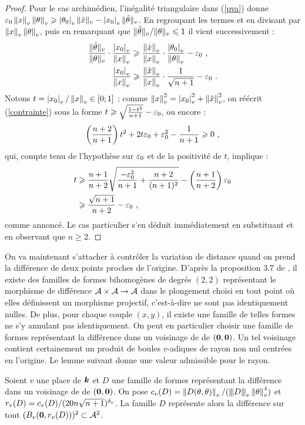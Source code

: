 \begin{proof}
  Pour le cas archimédien, l'inégalité triangulaire dans (\ref{pva}) donne
  $\varepsilon_0 \left\lVert x\right\rVert_{v}\left\lVert\theta\right\rVert_{v}  \geqslant \left\lvert\theta_0\right\rvert_{v}\|\hat{x}\|_{v} -
  \left\lvert x_0\right\rvert_{v}\|\hat{\theta}\|_{v} $. En regroupant les termes et en divisant par
  $\left\lVert x\right\rVert_{v}\left\lVert\theta\right\rVert_{v}$, puis en remarquant que $\|\hat{\theta}\|_{v}/\|\theta\|_{v} \leqslant
  1$ il vient successivement :
  \begin{align}
  \frac{\|\hat{\theta}\|_{v}}{\|\theta\|_{v}} \cdot \frac{\left\lvert x_0\right\rvert_{v}}{\left\lVert x\right\rVert_{v}}
  & \geqslant \frac{\left\lVert\hat{x}\right\rVert_{v}}{\left\lVert x\right\rVert_{v}}\cdot \frac{\left\lvert\theta_0\right\rvert_{v}}{\left\lVert\theta\right\rVert_{v}} -
  \varepsilon_0 \text{ ,} \notag \\
  \frac{\left\lvert x_0\right\rvert_{v}}{\left\lVert x\right\rVert_{v}} & \geqslant
  \frac{\left\lVert\hat{x}\right\rVert_{v}}{\left\lVert x\right\rVert_{v}}\cdot\frac{1}{\sqrt{n+1}} - \varepsilon_0 \text{ .}
  \label{contrainte}
  \end{align}
  Notons $t = \left\lvert x_0\right\rvert_{v}/\left\lVert x\right\rVert_{v} \in [0; 1]$ ; comme $\left\lVert x\right\rVert_{v}^2 = \left\lvert x_0\right\rvert_{v}^2 +
  \left\lVert\hat{x}\right\rVert_{v}^2$, on réécrit (\ref{contrainte}) sous la forme $t \geqslant
  \sqrt{\frac{1-t^2}{n+1}}-\varepsilon_0$, ou encore :
  \[
  \left(\frac{n+2}{n+1}\right)t^2 + 2t\varepsilon_0 + \varepsilon_0^2 - \frac{1}{n+1} \geqslant
  0 \text{ ,}
  \]
  qui, compte tenu de l'hypothèse sur $\varepsilon_0$ et de la positivité de $t$,
  implique :
  \begin{align*}
  t & \geqslant \frac{n+1}{n+2}\sqrt{\frac{-\varepsilon_0^2}{n+1}+\frac{n+2}{(n+1)^2}} -
  \left(\frac{n+1}{n+2}\right)\varepsilon_0\\
  & \geqslant \frac{\sqrt{n+1}}{n+2} - \varepsilon_0 \text{ ,}
  \end{align*}
  comme annoncé. Le cas particulier s'en déduit immédiatement en substituant
  et en observant que $n \ge 2$.
\end{proof}

On va maintenant s'attacher à contrôler la variation de distance quand on
prend la différence de deux points proches de l'origine. D'après la
proposition 3.7 de \cite{daphiminvaii}, il existe des familles de formes
bihomogènes de degrés $(2, 2)$ représentant le morphisme de différence
$\mathcal{A}\times\mathcal{A} \to \mathcal{A}$ dans le plongement choisi en tout point où elles
définissent un morphisme projectif, c'est-à-dire ne sont pas identiquement
nulles. De plus, pour chaque couple $(x, y)$, il existe une famille de telles
formes ne s'y annulant pas identiquement. On peut en particulier choisir une
famille de formes représentant la différence dans un voisinage de
 de $({\boldsymbol{0}}, {\boldsymbol{0}})$. Un tel voisinage contient certainement un
produit de boules $v$-adiques de rayon non nul centrées en l'origine. Le lemme
suivant donne une valeur admissible pour le rayon.

\begin{lem} \label{rayonRel}
  Soient $v$ une place de $\boldsymbol{k}$ et $D$ une famille de formes représentant la
  différence dans un voisinage de  de $({\boldsymbol{0}}, {\boldsymbol{0}})$. On pose
  $c_v(D) = \left\lVert D(\theta, \theta)\right\rVert_{v}/(\left\lvert\hspace{-1pt} \left\lvert\hspace{-1pt} \left\lvert D\right\rvert \hspace{-1pt}\right\rvert \hspace{-1pt}\right\rvert_{v}\left\lVert\theta\right\rVert_{v}^4)$ et $r_v(D) =
  c_v(D)/(20n\sqrt{n+1})^{\delta_v}$. La famille $D$ représente alors la différence
  sur tout $(B_v({\boldsymbol{0}}, r_v(D)))^2 \subset \mathcal{A}^2$.
\end{lem}

